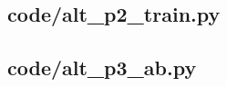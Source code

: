 \documentclass{swmcmthesis}
\begin{document}
\subsection*{code/alt\_p2\_train.py}


\subsection*{code/alt\_p3\_ab.py}

\end{document}
